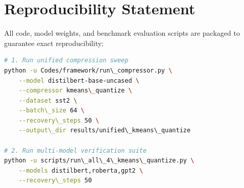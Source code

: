 \section{Reproducibility Statement}
All code, model weights, and benchmark evaluation scripts are packaged to guarantee exact reproducibility:
\begin{lstlisting}[language=bash]
# 1. Run unified compression sweep
python -u Codes/framework/run\_compressor.py \
    --model distilbert-base-uncased \
    --compressor kmeans\_quantize \
    --dataset sst2 \
    --batch\_size 64 \
    --recovery\_steps 50 \
    --output\_dir results/unified\_kmeans\_quantize

# 2. Run multi-model verification suite
python -u scripts/run\_all\_4\_kmeans\_quantize.py \
    --models distilbert,roberta,gpt2 \
    --recovery\_steps 50
\end{lstlisting}
